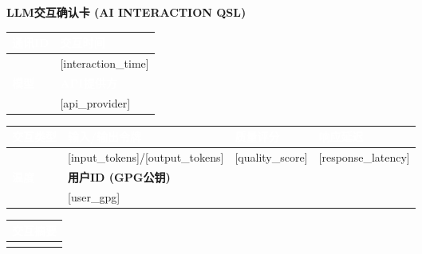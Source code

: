 \documentclass[a4paper,12pt]{article}
\begin{document}
\begin{center}
    \Large{\textbf{LLM交互确认卡 (AI INTERACTION QSL)}}
\end{center}

\vspace{0.5cm}

\begin{tabularx}{\textwidth}{|X|X|}
    \hline
    \rowcolor{headercolor}\textcolor{white}{\textbf{通讯ID}} & \rowcolor{headercolor}\textcolor{white}{\textbf{交互时间}} \\
    \hline
    [communication_id] & [interaction_time] \\
    \hline
    \rowcolor{headercolor}\textcolor{white}{\textbf{模型}} & \rowcolor{headercolor}\textcolor{white}{\textbf{API提供方}} \\
    \hline
    [model] & [api_provider] \\
    \hline
\end{tabularx}

\vspace{0.3cm}

\begin{tabularx}{\textwidth}{|X|X|X|X|}
    \hline
    \rowcolor{headercolor}\textcolor{white}{\textbf{交互类型}} & \rowcolor{headercolor}\textcolor{white}{\textbf{输入/输出令牌}} & \rowcolor{headercolor}\textcolor{white}{\textbf{质量评分}} & \rowcolor{headercolor}\textcolor{white}{\textbf{响应延迟}} \\
    \hline
    [interaction_type] & [input_tokens]/[output_tokens] & [quality_score] & [response_latency] \\
    \hline
    \rowcolor{headercolor}\textcolor{white}{\textbf{温度}} & \multicolumn{3}{l|}{\textbf{用户ID (GPG公钥)}} \\
    \hline
    [temperature] & \multicolumn{3}{l|}{[user_gpg]} \\
    \hline
\end{tabularx}

\vspace{0.3cm}

\begin{tabularx}{\textwidth}{|X|}
    \hline
    \rowcolor{headercolor}\textcolor{white}{\textbf{交互摘要}} \\
    \hline
    [interaction_summary] \\
    \hline
\end{tabularx}

\vspace{0.3cm}
\end{document}
